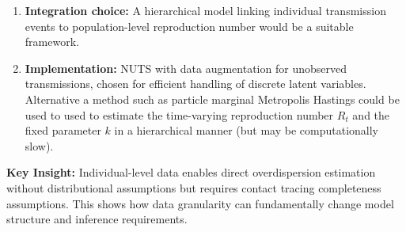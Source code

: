 \documentclass{article}
\begin{document}
\begin{enumerate}
    \item \textbf{Integration choice:} A hierarchical model linking individual transmission events to population-level reproduction number would be a suitable framework.
    \item \textbf{Implementation:} NUTS with data augmentation for unobserved transmissions, chosen for efficient handling of discrete latent variables. Alternative a method such as particle marginal Metropolis Hastings could be used to used to estimate the time-varying reproduction number $R_t$ and the fixed parameter $k$ in a hierarchical manner (but may be computationally slow). 
\end{enumerate}

\textbf{Key Insight:} Individual-level data enables direct overdispersion estimation without distributional assumptions but requires contact tracing completeness assumptions. This shows how data granularity can fundamentally change model structure and inference requirements.
\end{document}
